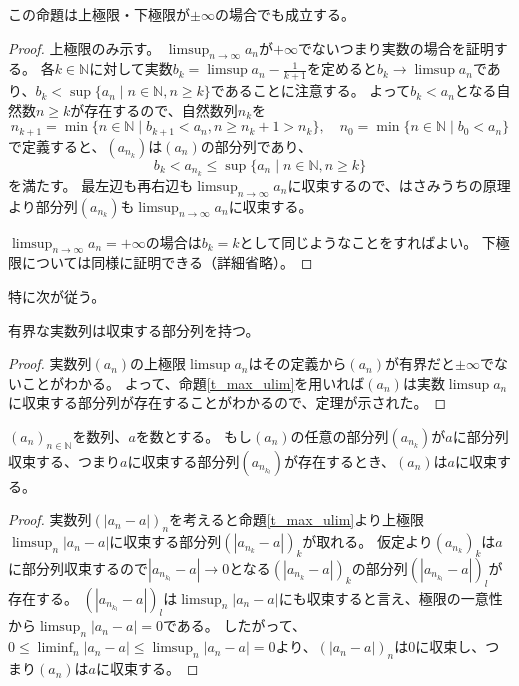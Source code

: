 \begin{remark}
この命題は上極限・下極限が$\pm \infty$の場合でも成立する。
\end{remark}

\begin{proof}
上極限のみ示す。
$\limsup_{n \to \infty}a_n$が$+\infty$でないつまり実数の場合を証明する。
各$k \in \mathbb{N}$に対して実数$b_k = \limsup a_n-\frac{1}{k+1}$を定めると$b_k \to \limsup a_n$であり、$b_k < \sup\{ a_n \mid n \in \mathbb{N}, n \ge k \}$であることに注意する。
よって$b_k < a_n$となる自然数$n \ge k$が存在するので、自然数列$n_k$を
$$
n_{k+1} = \min\{ n \in \mathbb{N} \mid b_{k+1} < a_n, n \ge n_k+1 > n_k \},
\quad n_0 = \min\{ n \in \mathbb{N} \mid b_0 < a_n \}
$$
で定義すると、$(a_{n_k})$は$(a_n)$の部分列であり、
$$
b_k < a_{n_k} \le \sup\{ a_n \mid n \in \mathbb{N}, n \ge k \}
$$
を満たす。
最左辺も再右辺も$\limsup_{n \to \infty}a_n$に収束するので、はさみうちの原理より部分列$(a_{n_k})$も$\limsup_{n \to \infty}a_n$に収束する。

$\limsup_{n \to \infty}a_n = +\infty$の場合は$b_k = k$として同じようなことをすればよい。
下極限については同様に証明できる（詳細省略）。
\end{proof}

特に次が従う。

\begin{theorem}
有界な実数列は収束する部分列を持つ。
\end{theorem}

\begin{proof}
実数列$(a_n)$の上極限$\limsup a_n$はその定義から$(a_n)$が有界だと$\pm \infty$でないことがわかる。
よって、命題\ref{t_max_ulim}を用いれば$(a_n)$は実数$\limsup a_n$に収束する部分列が存在することがわかるので、定理が示された。
\end{proof}

\begin{theorem}
$(a_n)_{n \in \mathbb{N}}$を数列、$a$を数とする。
もし$(a_n)$の任意の部分列$(a_{n_k})$が$a$に部分列収束する、つまり$a$に収束する部分列$(a_{n_{k_l}})$が存在するとき、$(a_n)$は$a$に収束する。
\end{theorem}

\begin{proof}
実数列$(|a_n-a|)_n$を考えると命題\ref{t_max_ulim}より上極限$\limsup_n|a_n-a|$に収束する部分列$(|a_{n_k}-a|)_k$が取れる。
仮定より$(a_{n_k})_k$は$a$に部分列収束するので$|a_{n_{k_l}}-a| \to 0$となる$(|a_{n_k}-a|)_k$の部分列$(|a_{n_{k_l}}-a|)_l$が存在する。
$(|a_{n_{k_l}}-a|)_l$は$\limsup_n|a_n-a|$にも収束すると言え、極限の一意性から$\limsup_n|a_n-a| = 0$である。
したがって、$0 \le \liminf_n|a_n-a| \le \limsup_n|a_n-a| = 0$より、$(|a_n-a|)_n$は$0$に収束し、つまり$(a_n)$は$a$に収束する。
\end{proof}

